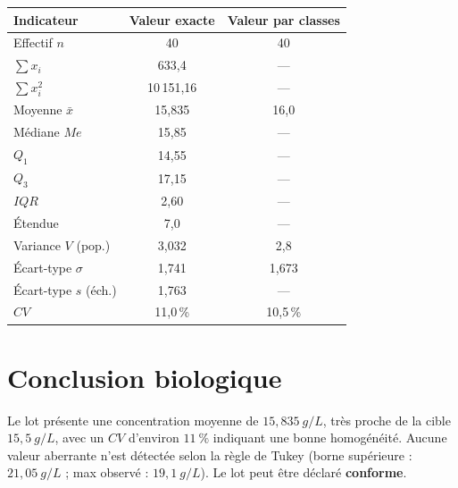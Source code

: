 \documentclass[11pt,a4paper]{article}
\begin{document}
\begin{center}
\small
\begin{tabular}{|l|c|c|}
\hline
\rowcolor{calchead}
\textbf{Indicateur} & \textbf{Valeur exacte} & \textbf{Valeur par classes} \\ \hline
Effectif \( n \)            & 40      & 40 \\ \hline
\( \sum x_i \)              & 633,4   & --- \\ \hline
\( \sum x_i^2 \)            & 10\,151,16 & --- \\ \hline
Moyenne \( \bar{x} \)       & 15,835  & 16,0 \\ \hline
Médiane \( Me \)            & 15,85   & --- \\ \hline
\( Q_1 \)                   & 14,55   & --- \\ \hline
\( Q_3 \)                   & 17,15   & --- \\ \hline
\( IQR \)                   & 2,60    & --- \\ \hline
Étendue                     & 7,0     & --- \\ \hline
Variance \( V \) (pop.)     & 3,032   & 2,8 \\ \hline
Écart-type \( \sigma \)     & 1,741   & 1,673 \\ \hline
Écart-type \( s \) (éch.)   & 1,763   & --- \\ \hline
\( CV \)                    & 11,0\,\% & 10,5\,\% \\ \hline
\end{tabular}
\end{center}

\section*{Conclusion biologique}

Le lot présente une concentration moyenne de
\( 15{,}835\ \si{g/L} \), très proche de la cible \( 15{,}5\ \si{g/L} \),
avec un \( CV \) d'environ \( 11\ \% \) indiquant une bonne homogénéité.
Aucune valeur aberrante n'est détectée selon la règle de Tukey
(borne supérieure : \( 21{,}05\ \si{g/L} \) ; max observé :
\( 19{,}1\ \si{g/L} \)). Le lot peut être déclaré
\textbf{conforme}.
\end{document}
